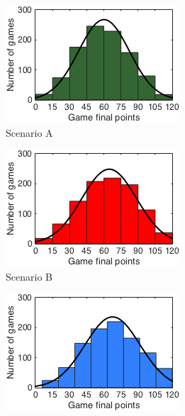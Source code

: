 \begin{figure}[h]
        \centering
        \begin{subfigure}[h]{0.32\textwidth}
                \includegraphics[width=\textwidth]{./img/4/histA}
                \caption{Scenario A}
                \label{fig:histA}
        \end{subfigure}
        \begin{subfigure}[h]{0.32\textwidth}
                \includegraphics[width=\textwidth]{./img/4/histB}
                \caption{Scenario B}
                \label{fig:histB}
        \end{subfigure}
        \begin{subfigure}[h]{0.32\textwidth}
                \includegraphics[width=\textwidth]{./img/4/histC}

\end{subfigure}
\end{figure}
